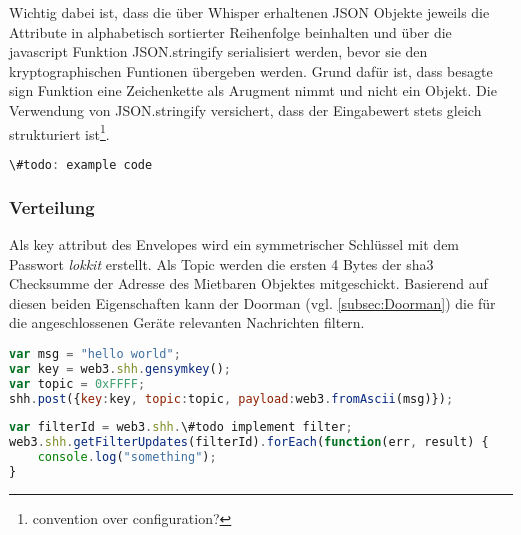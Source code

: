 Wichtig dabei ist, dass die über Whisper erhaltenen JSON Objekte jeweils die Attribute in alphabetisch sortierter Reihenfolge beinhalten und über die javascript Funktion JSON.stringify serialisiert werden, bevor sie den kryptographischen Funtionen übergeben werden. Grund dafür ist, dass besagte sign Funktion eine Zeichenkette als Arugment nimmt und nicht ein Objekt. Die Verwendung von JSON.stringify versichert, dass der Eingabewert stets gleich strukturiert ist\footnote{convention over configuration?}.

\begin{lstlisting}[language=javascript,caption={beispiel generate digest und ecRecover}]
\#todo: example code
\end{lstlisting}


\subsubsection{Verteilung}
\label{sys_subsubsec:Verteilung}
Als key attribut des Envelopes wird ein symmetrischer Schlüssel mit dem Passwort \emph{lokkit} erstellt. Als Topic werden die ersten 4 Bytes der sha3 Checksumme der Adresse des Mietbaren Objektes mitgeschickt. Basierend auf diesen beiden Eigenschaften kann der Doorman (vgl. \ref{subsec:Doorman}) die für die angeschlossenen Geräte relevanten Nachrichten filtern.

\begin{lstlisting}[language=javascript,caption={Beispiel einer Whisper v5 Nachricht}]
var msg = "hello world";
var key = web3.shh.gensymkey();
var topic = 0xFFFF;
shh.post({key:key, topic:topic, payload:web3.fromAscii(msg)});
\end{lstlisting}


\begin{lstlisting}[language=javascript,caption={Beispiel eines Whisper v5 Filters}]
var filterId = web3.shh.\#todo implement filter;
web3.shh.getFilterUpdates(filterId).forEach(function(err, result) {
    console.log("something");
}
\end{lstlisting}